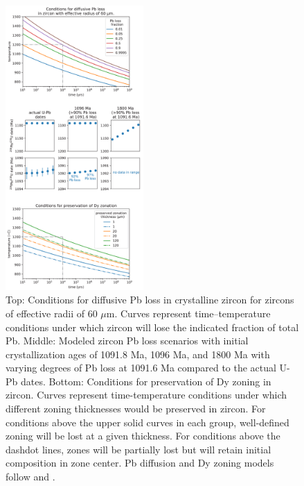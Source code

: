 \begin{figure}[h!]
\noindent\includegraphics[width=0.47\textwidth]{figure/Zhang2021/diffusive_loss.pdf}
\centering
\caption[Zircon Pb and Dy diffusion modeling associated with sample MS99033]{\footnotesize{Top: Conditions for diffusive Pb loss in crystalline zircon for zircons of effective radii of 60 $\mu$m. Curves represent time--temperature conditions under which zircon will lose the indicated fraction of total Pb. Middle: Modeled zircon Pb loss scenarios with initial crystallization ages of 1091.8 Ma, 1096 Ma, and 1800 Ma with varying degrees of Pb loss at 1091.6 Ma compared to the actual U-Pb dates. Bottom: Conditions for preservation of Dy zoning in zircon. Curves represent time-temperature conditions under which different zoning thicknesses would be preserved in zircon. For conditions above the upper solid curves in each group, well-defined zoning will be lost at a given thickness. For conditions above the dashdot lines, zones will be partially lost but will retain initial composition in zone center. Pb diffusion and Dy zoning models follow \cite{Cherniak2001a} and \cite{Cherniak1997a}.}}
\label{fig:diffusive_loss}
\end{figure}

